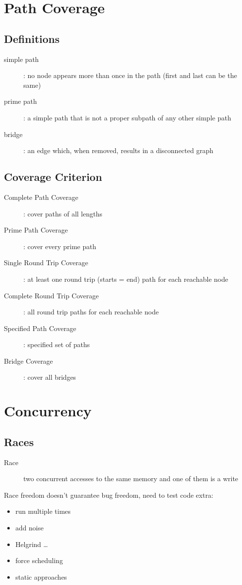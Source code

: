 \documentclass[]{article}
\theoremstyle{definition}
\begin{document}
	\section{Path Coverage}
		\subsection{Definitions}
			\begin{description}
				\item[simple path]: no node appears more than once in the path (first and last can be the same)
				\item[prime path]: a simple path that is not a proper subpath of any other simple path
				\item[bridge]: an edge which, when removed, results in a disconnected graph
			\end{description}
			
		\subsection{Coverage Criterion}
			\begin{description}
				\item[Complete Path Coverage]: cover paths of all lengths
				\item[Prime Path Coverage]: cover every prime path
				\item[Single Round Trip Coverage]: at least one round trip (starts = end) path for each reachable node
				\item[Complete Round Trip Coverage]: all round trip paths for each reachable node
				\item[Specified Path Coverage]: specified set of paths
				\item[Bridge Coverage]: cover all bridges
			\end{description}
	\section{Concurrency}
		\subsection{Races}
			\begin{description}
				\item[Race] two concurrent accesses to the same memory and one of them is a write
			\end{description}
			
			Race freedom doesn't guarantee bug freedom, need to test code extra:
			\begin{itemize}
				\item run multiple times
				\item add noise
				\item Helgrind \ldots
				\item force scheduling
				\item static approaches
			\end{itemize}
\end{document}
